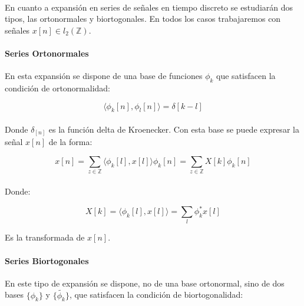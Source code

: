 \paragraph{}
En cuanto a expansión en series de señales en tiempo discreto se estudiarán dos tipos, las ortonormales y biortogonales. En todos los casos trabajaremos con señales $x[n] \in l_{2}(\mathbb{Z})$.


\paragraph{Series Ortonormales}
En esta expansión se dispone de una base de funciones $\phi_k$ que satisfacen la condición de ortonormalidad:

\begin{equation}
	\langle \phi_k[n] , \phi_l[n] \rangle = \delta[k - l]
\end{equation}

\paragraph{}
Donde $\delta_[n]$ es la función delta de Kroenecker. Con esta base se puede expresar la señal $x[n]$ de la forma:

\begin{equation}
	x[n] = \sum_{z \in \mathbb{Z}} \langle \phi_k[l] , x[l] \rangle \phi_{k}[n] = \sum_{z \in \mathbb{Z}} X[k] \phi_{k}[n]
\end{equation}

\paragraph{}
Donde:

\begin{equation}
	X[k] = \langle \phi_k[l] , x[l] \rangle = \sum_{l} \phi_{k}^{*} x[l]
\end{equation}

Es la transformada de $x[n]$.


\paragraph{Series Biortogonales}
En este tipo de expansión se dispone, no de una base ortonormal, sino de dos bases $\{ \phi_{k} \}$ y $\{ \tilde{\phi_{k}} \}$, que satisfacen la condición de biortogonalidad:

